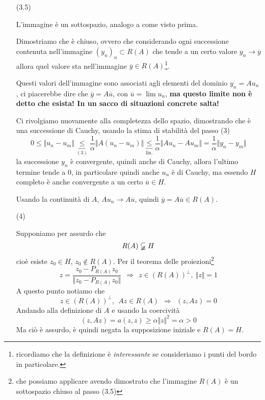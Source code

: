 \documentclass[10pt,a4paper,twoside,openright]{book}
\begin{document}
\begin{dimostrazione}
\begin{itemize}
		\item[(3.5)]

		L'immagine è un sottospazio, analogo a come visto prima.

		Dimostriamo che è chiuso, ovvero che considerando ogni successione contenuta nell'immagine $(y_{n})_{n} \subset R(A)$ che tende a un certo valore $y_{n}\rightarrow \overline{y}$ allora quel valore sta nell'immagine $\overline{y} \in R(A)$\footnote{ricordiamo che la definizione è \textit{interessante} se consideriamo i punti del bordo in particolare.}.

		Questi valori dell'immagine sono associati agli elementi del dominio $y_{n} =Au_{n}$, ci piacerebbe dire che $\overline{y} =A\overline{u}$, con $\overline{u} =\lim u_{n}$, \textbf{ma questo limite non è detto che esista! In un sacco di situazioni concrete salta!}

		Ci rivolgiamo nuovamente alla completezza dello spazio, dimostrando che è una successione di Cauchy, usando la stima di stabilità del passo (3)
		\begin{equation*}
			0\leqslant \Vert u_{n} -u_{m}\Vert \underbrace{\leqslant }_{(3)}\frac{1}{\alpha }\Vert A(u_{n} -u_{m})\Vert \underbrace{\leqslant }_{\text{lin.}}\frac{1}{\alpha }\Vert Au_{n} -Au_{m}\Vert =\frac{1}{\alpha }\Vert y_{n} -y_{m}\Vert 
		\end{equation*}
		la successione $y_{n}$ è convergente, quindi anche di Cauchy, allora l'ultimo termine tende a $0$, in particolare quindi anche $u_{n}$ è di Cauchy, ma essendo $H$ completo è anche convergente a un certo $\overline{u} \in H$.

		Usando la continuità di $A$, $Au_{n}\rightarrow A\overline{u}$, quindi $\overline{y} =A\overline{u} \in R(A)$.



		\item[(4)]

		Supponiamo per assurdo che
		\begin{equation*}
			R(A) \varsubsetneqq H
		\end{equation*}
		cioè esiste $z_{0} \in H$, $z_{0} \notin R(A)$. Per il teorema delle proiezioni\footnote{che possiamo applicare avendo dimostrato che l'immagine $R(A)$ è un sottospazio chiuso al passo (3.5)}
		\begin{equation*}
			z=\frac{z_{0} -P_{R(A)} z_{0}}{\Vert z_{0} -P_{R(A)} z_{0}\Vert } \ \ \Rightarrow \ \ z\in (R(A))^{\perp },\ \Vert z\Vert =1
		\end{equation*}
		A questo punto notiamo che
		\begin{equation*}
			z\in (R(A))^{\perp },\ \ Az\in R(A) \ \ \Rightarrow \ \ (z,Az) =0
		\end{equation*}
		Andando alla definizione di $A$ e usando la coercività
		\begin{equation*}
			(z,Az) =a(z,z) \geqslant \alpha \Vert z\Vert ^{2} =\alpha  >0
		\end{equation*}
		Ma ciò è assurdo, è quindi negata la supposizione iniziale e $R(A) =H$.
	\end{itemize}
\end{dimostrazione}
\end{document}
